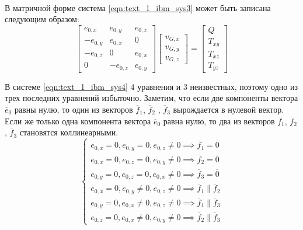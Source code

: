 \

В матричной форме система \eqref{eqn:text_1_ibm_sys3} может быть записана следующим образом:
\begin{equation}\label{eqn:text_1_ibm_sys4}
	\begin{bmatrix}
		e_{0,x} & e_{0,y} & e_{0,z} \\
		-e_{0,y} & e_{0,x} & 0 \\
		-e_{0,z} & 0 & e_{0,x} \\
		0 & -e_{0,z} & e_{0,y}
	\end{bmatrix}
	\begin{bmatrix}
		v_{G,x} \\
		v_{G,y} \\
		v_{G,z}
	\end{bmatrix} =
	\begin{bmatrix}
		Q \\
		T_{xy} \\
		T_{xz} \\
		T_{yz}
	\end{bmatrix}			
\end{equation}

В системе \eqref{eqn:text_1_ibm_sys4} 4 уравнения и 3 неизвестных, поэтому одно из трех последних уравнений избыточно.
Заметим, что если две компоненты вектора $\overline{e}_0$ равны нулю, то один из векторов $\overline{f}_1$, $\overline{f}_2$ , $\overline{f}_3$ вырождается в нулевой вектор.
Если же только одна компонента вектора $\overline{e}_0$ равна нулю, то два из векторов $\overline{f}_1$, $\overline{f}_2$ , $\overline{f}_3$ становятся коллинеарными.
\begin{equation}
	\left\{
		\begin{aligned}
			e_{0,x} = 0, e_{0,y} = 0, e_{0,z} \ne 0 \implies \overline{f}_1 = \overline{0} \\
			e_{0,x} = 0, e_{0,z} = 0, e_{0,y} \ne 0 \implies \overline{f}_2 = \overline{0} \\
			e_{0,y} = 0, e_{0,z} = 0, e_{0,x} \ne 0 \implies \overline{f}_3 = \overline{0} \\
			e_{0,x} = 0, e_{0,y} \ne 0, e_{0,z} \ne 0 \implies \overline{f}_1 \parallel \overline{f}_2 \\
			e_{0,y} = 0, e_{0,x} \ne 0, e_{0,z} \ne 0 \implies \overline{f}_1 \parallel \overline{f}_3 \\
			e_{0,z} = 0, e_{0,x} \ne 0, e_{0,y} \ne 0 \implies \overline{f}_2 \parallel \overline{f}_3
		\end{aligned}
	\right.
\end{equation}


